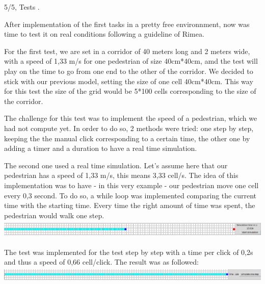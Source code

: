 \documentclass[10pt,a4paper]{article}
\begin{document}
\begin{task}{5/5, Tests}
.\newline\newline

After implementation of the first tasks in a pretty free environnment, now was time to test it on real conditions following a guideline of Rimea.\newline\newline

For the first test, we are set in a corridor of 40 meters long and 2 meters wide, with a speed of 1,33 m/s for one pedestrian of size 40cm*40cm, amd the test will play on the time to go from one end to the other of the corridor. \newline
We decided to stick with our previous model, setting the size of one cell 40cm*40cm. This way for this test the size of the grid would be 5*100 cells corresponding to the size of the corridor. \newline 

The challenge for this test was to implement the speed of a pedestrian, which we had not compute yet. In order to do so, 2 methods were tried: one step by step, keeping the the manual click corresponding to a certain time, the other one by adding a timer and a duration to have a real time simulation. \newline 

The second one used a real time simulation. Let's assume here that our pedestrian has a speed of 1,33 m/s, this means 3,33 cell/s. The idea of this implementation was to have - in this very example - our pedestrian move one cell every 0,3 second. To do so, a while loop was implemented comparing the current  time with the starting time. Every time the right amount of time was spent, the pedestrian would walk one step. \newline\newline
\includegraphics[height=0.9cm]{speed4} \newline \newline

The test was implemented for the test step by step with a time per click of 0,2s and thus a speed of 0,66 cell/click. The result was as followed: \newline \newline
\includegraphics[height=0.78cm]{speed3}


\end{task}
\end{document}
